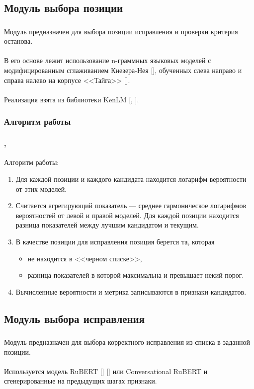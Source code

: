\documentclass[t, aspectratio=169]{beamer}  %
\begin{document}
\subsection{Модуль выбора позиции}
\begin{frame}
	\frametitle{\insertsection} 
	\framesubtitle{\insertsubsection}
	Модуль предназначен для выбора позиции исправления и проверки критерия останова.  \\~\\
	
	В его основе лежит использование n-граммных языковых моделей с модифицированным сглаживанием Кнезера-Нея [\textcite{Chen1996}], обученных слева направо и справа налево на корпусе <<Тайга>> [\textcite{Shavrina2017}]. \\~\\
	
	Реализация взята из библиотеки KenLM [\textcite{Heafield2011}, \textcite{Heafield2013}].
\end{frame}

\subsubsection{Алгоритм работы}
\begin{frame}
	\frametitle{\insertsection} 
	\framesubtitle{\insertsubsection, \insertsubsubsection}
	Алгоритм работы:
	\begin{enumerate}
		\item  Для каждой позиции и каждого кандидата находится логарифм вероятности от этих моделей.
		\item Считается агрегирующий показатель --- среднее гармоническое логарифмов вероятностей от левой и правой моделей. Для каждой позиции находится разница показателей между лучшим кандидатом и текущим.
		\item В качестве позиции для исправления позиция берется та, которая
		\begin{itemize}
			\item не находится в <<черном списке>>,
			\item разница показателей в которой максимальна и превышает некий порог.
		\end{itemize}
		\item Вычисленные вероятности и метрика записываются в признаки кандидатов.
	\end{enumerate}
\end{frame}

\subsection{Модуль выбора исправления}
\begin{frame}
	\frametitle{\insertsection} 
	\framesubtitle{\insertsubsection}
	Модуль предназначен для выбора корректного исправления из списка в заданной позиции. \\~\\
	
	Используется модель RuBERT [\textcite{Devlin2019}] [\textcite{Kuratov2019}] или Conversational RuBERT и сгенерированные на предыдущих шагах признаки.
\end{frame}
\end{document}
